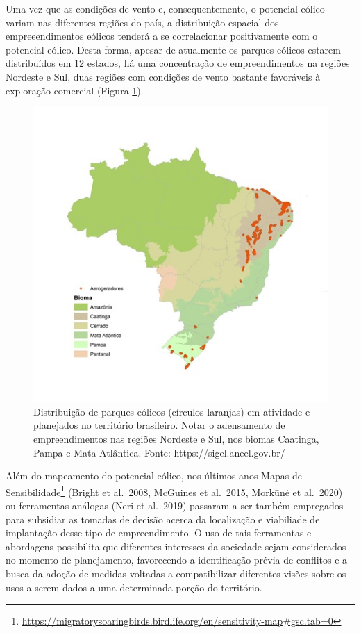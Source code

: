 \documentclass[
  oneside]{scrbook}
\DeclareRobustCommand{\href}[2]{#2\footnote{\url{#1}}}
\begin{document}
Uma vez que as condições de vento e, consequentemente, o potencial eólico variam nas diferentes regiões do país, a distribuição espacial dos empreeendimentos eólicos tenderá a se correlacionar positivamente com o potencial eólico. Desta forma, apesar de atualmente os parques eólicos estarem distribuídos em 12 estados, há uma concentração de empreendimentos na regiões Nordeste e Sul, duas regiões com condições de vento bastante favoráveis à exploração comercial (Figura \ref{fig:04}).

\begin{figure}[H]

{\centering \includegraphics[width=0.7\linewidth]{imagens/cap01/Figura_1.4} 

}

\caption{Distribuição de parques eólicos (círculos laranjas) em atividade e planejados no território brasileiro. Notar o adensamento de empreendimentos nas regiões Nordeste e Sul, nos biomas Caatinga, Pampa e Mata Atlântica. Fonte: https://sigel.aneel.gov.br/}\label{fig:04}
\end{figure}

Além do mapeamento do potencial eólico, nos últimos anos \href{https://migratorysoaringbirds.birdlife.org/en/sensitivity-map\#gsc.tab=0}{Mapas de Sensibilidade} (Bright et al.~2008, McGuines et al.~2015, Morkūnė et al.~2020) ou ferramentas análogas (Neri et al.~2019) passaram a ser também empregados para subsidiar as tomadas de decisão acerca da localização e viabiliade de implantação desse tipo de empreendimento. O uso de tais ferramentas e abordagens possibilita que diferentes interesses da sociedade sejam considerados no momento de planejamento, favorecendo a identificação prévia de conflitos e a busca da adoção de medidas voltadas a compatibilizar diferentes visões sobre os usos a serem dados a uma determinada porção do território.
\end{document}
